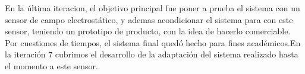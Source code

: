 En la última iteracion, el objetivo principal fue poner a prueba el sistema con un sensor de campo electrostático, y ademas acondicionar el sistema para con este sensor, teniendo un prototipo de producto, con la idea de hacerlo comerciable. Por cuestiones de tiempos, el sistema final quedó hecho para fines académicos.En la iteración 7 cubrimos el desarrollo de la adaptación del sistema realizado hasta el momento a este sensor. \\










